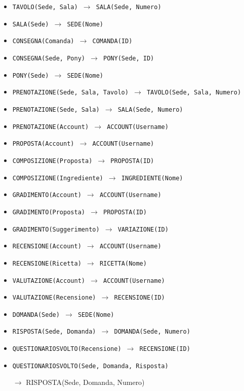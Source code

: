 \begin{itemize}[parsep=0pt,listparindent=9\parindent]
    \item\tt TAVOLO(Sede, Sala) $\rightarrow$ SALA(Sede, Numero)
    \item\tt SALA(Sede) $\rightarrow$ SEDE(Nome)
    \item\tt CONSEGNA(Comanda) $\rightarrow$ COMANDA(ID)
    \item\tt CONSEGNA(Sede, Pony) $\rightarrow$ PONY(Sede, ID)
    \item\tt PONY(Sede) $\rightarrow$ SEDE(Nome)
    \item\tt PRENOTAZIONE(Sede, Sala, Tavolo) $\rightarrow$ TAVOLO(Sede, Sala, Numero)
    \item\tt PRENOTAZIONE(Sede, Sala) $\rightarrow$ SALA(Sede, Numero)
    \item\tt PRENOTAZIONE(Account) $\rightarrow$ ACCOUNT(Username)
    \item\tt PROPOSTA(Account) $\rightarrow$ ACCOUNT(Username)
    \item\tt COMPOSIZIONE(Proposta) $\rightarrow$ PROPOSTA(ID)
    \item\tt COMPOSIZIONE(Ingrediente) $\rightarrow$ INGREDIENTE(Nome)
    \item\tt GRADIMENTO(Account) $\rightarrow$ ACCOUNT(Username)
    \item\tt GRADIMENTO(Proposta) $\rightarrow$ PROPOSTA(ID)
    \item\tt GRADIMENTO(Suggerimento) $\rightarrow$ VARIAZIONE(ID)
    \item\tt RECENSIONE(Account) $\rightarrow$ ACCOUNT(Username)
    \item\tt RECENSIONE(Ricetta) $\rightarrow$ RICETTA(Nome)
    \item\tt VALUTAZIONE(Account) $\rightarrow$ ACCOUNT(Username)
    \item\tt VALUTAZIONE(Recensione) $\rightarrow$ RECENSIONE(ID)
    \item\tt DOMANDA(Sede) $\rightarrow$ SEDE(Nome)
    \item\tt RISPOSTA(Sede, Domanda) $\rightarrow$ DOMANDA(Sede, Numero)
    \item\tt QUESTIONARIOSVOLTO(Recensione) $\rightarrow$ RECENSIONE(ID)
    \item\tt QUESTIONARIOSVOLTO(Sede, Domanda, Risposta)
    
        $\rightarrow$ RISPOSTA(Sede, Domanda, Numero)
\end{itemize}
